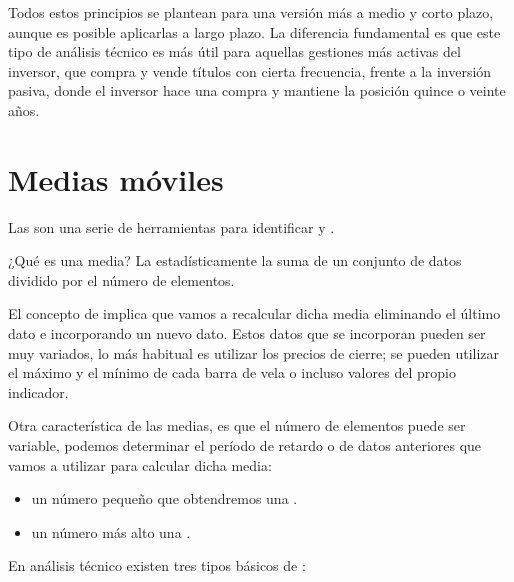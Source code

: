Todos estos principios se plantean para una versión más a medio y corto plazo, aunque es posible aplicarlas a largo plazo. La diferencia fundamental es que este tipo de análisis técnico es más útil para aquellas gestiones más activas del inversor, que compra y vende títulos con cierta frecuencia, frente a la inversión pasiva, donde el inversor hace una compra y mantiene la posición quince o veinte años.

\section{Medias móviles}

Las  son una serie de herramientas para identificar  y .

¿Qué es una media? La  estadísticamente la suma de un conjunto de datos dividido por el número de elementos. 

El concepto de  implica que vamos a recalcular dicha media eliminando el último dato e incorporando un nuevo dato. Estos datos que se incorporan pueden ser muy variados, lo más habitual es utilizar los precios de cierre; se pueden utilizar el máximo y el mínimo de cada barra de vela o incluso valores del propio indicador.

Otra característica de las medias, es que el número de elementos puede ser variable, podemos determinar el período de retardo o de datos anteriores que vamos a utilizar para calcular dicha media:
\begin{itemize}
    \item un número pequeño  que obtendremos una .
    \item un número más alto  una .
\end{itemize} 

En análisis técnico existen tres tipos básicos de :

